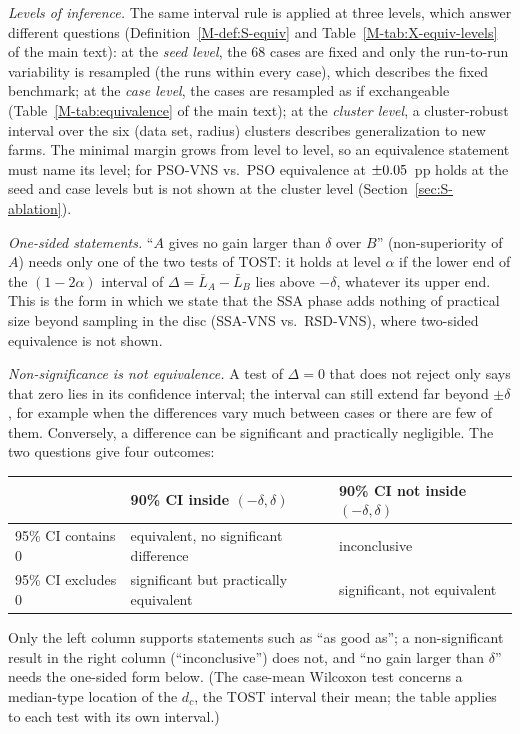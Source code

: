 \emph{Levels of inference.} The same interval rule is applied at three levels, which answer different questions (Definition~\ref{M-def:S-equiv} and Table~\ref{M-tab:X-equiv-levels} of the main text): at the \emph{seed level}, the 68 cases are fixed and only the run-to-run variability is resampled (the runs within every case), which describes the fixed benchmark; at the \emph{case level}, the cases are resampled as if exchangeable (Table~\ref{M-tab:equivalence} of the main text); at the \emph{cluster level}, a cluster-robust interval over the six (data set, radius) clusters describes generalization to new farms. The minimal margin grows from level to level, so an equivalence statement must name its level; for PSO-VNS vs.\ PSO equivalence at $\pm0.05$~pp holds at the seed and case levels but is not shown at the cluster level (Section~\ref{sec:S-ablation}).

\emph{One-sided statements.} ``$A$ gives no gain larger than $\delta$ over $B$'' (non-superiority of $A$) needs only one of the two tests of TOST: it holds at level $\alpha$ if the lower end of the $(1-2\alpha)$ interval of $\Delta=\bar L_A-\bar L_B$ lies above $-\delta$, whatever its upper end. This is the form in which we state that the SSA phase adds nothing of practical size beyond sampling in the disc (SSA-VNS vs.\ RSD-VNS), where two-sided equivalence is not shown.

\emph{Non-significance is not equivalence.} A test of $\Delta=0$ that does not reject only says that zero lies in its confidence interval; the interval can still extend far beyond $\pm\delta$, for example when the differences vary much between cases or there are few of them. Conversely, a difference can be significant and practically negligible. The two questions give four outcomes:

\begin{center}
\small
\begin{tabular}{lll}
\toprule
& 90\% CI inside $(-\delta,\delta)$ & 90\% CI not inside $(-\delta,\delta)$\\
\midrule
95\% CI contains 0 & equivalent, no significant difference & inconclusive\\
95\% CI excludes 0 & significant but practically equivalent & significant, not equivalent\\
\bottomrule
\end{tabular}
\end{center}
Only the left column supports statements such as ``as good as''; a non-significant result in the right column (``inconclusive'') does not, and ``no gain larger than $\delta$'' needs the one-sided form below. (The case-mean Wilcoxon test concerns a median-type location of the $d_c$, the TOST interval their mean; the table applies to each test with its own interval.)

